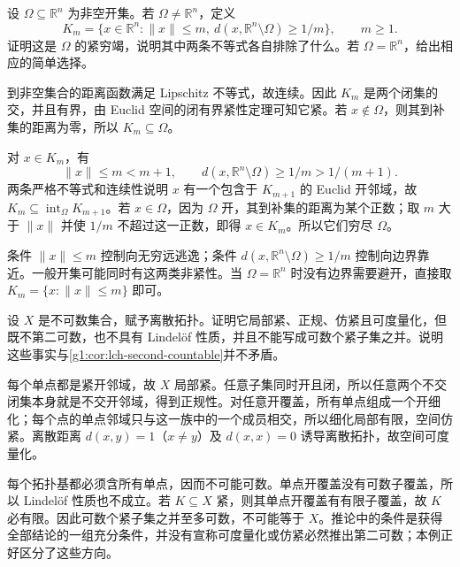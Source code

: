 \begin{exercise}\label{g1:ex:open-euclidean-exhaustion}
	设 \(\Omega\subseteq\mathbb R^n\) 为非空开集。若 \(\Omega\ne\mathbb R^n\)，定义
	\[
		K_m=\{x\in\mathbb R^n:\lVert x\rVert\le m,\ d(x,\mathbb R^n\setminus\Omega)\ge1/m\},
		\qquad m\ge1.
	\]
	证明这是 \(\Omega\) 的紧穷竭，说明其中两条不等式各自排除了什么。若 \(\Omega=\mathbb R^n\)，给出相应的简单选择。
\end{exercise}
\begin{solution}
	到非空集合的距离函数满足 Lipschitz 不等式，故连续。因此 \(K_m\) 是两个闭集的交，并且有界，由 Euclid 空间的闭有界紧性定理可知它紧。若 \(x\notin\Omega\)，则其到补集的距离为零，所以 \(K_m\subseteq\Omega\)。

	对 \(x\in K_m\)，有
	\[
		\lVert x\rVert\le m<m+1,\qquad
		d(x,\mathbb R^n\setminus\Omega)\ge1/m>1/(m+1).
	\]
	两条严格不等式和连续性说明 \(x\) 有一个包含于 \(K_{m+1}\) 的 Euclid 开邻域，故 \(K_m\subseteq\operatorname{int}_\Omega K_{m+1}\)。若 \(x\in\Omega\)，因为 \(\Omega\) 开，其到补集的距离为某个正数；取 \(m\) 大于 \(\lVert x\rVert\) 并使 \(1/m\) 不超过这一正数，即得 \(x\in K_m\)。所以它们穷尽 \(\Omega\)。

	条件 \(\lVert x\rVert\le m\) 控制向无穷远逃逸；条件 \(d(x,\mathbb R^n\setminus\Omega)\ge1/m\) 控制向边界靠近。一般开集可能同时有这两类非紧性。当 \(\Omega=\mathbb R^n\) 时没有边界需要避开，直接取 \(K_m=\{x:\lVert x\rVert\le m\}\) 即可。
\end{solution}

\begin{exercise}\label{g1:ex:uncountable-discrete}
	设 \(X\) 是不可数集合，赋予离散拓扑。证明它局部紧、正规、仿紧且可度量化，但既不第二可数，也不具有 Lindelöf 性质，并且不能写成可数个紧子集之并。说明这些事实与\cref{g1:cor:lch-second-countable}并不矛盾。
\end{exercise}
\begin{solution}
	每个单点都是紧开邻域，故 \(X\) 局部紧。任意子集同时开且闭，所以任意两个不交闭集本身就是不交开邻域，得到正规性。对任意开覆盖，所有单点组成一个开细化；每个点的单点邻域只与这一族中的一个成员相交，所以细化局部有限，空间仿紧。离散距离 \(d(x,y)=1\)（\(x\ne y\)）及 \(d(x,x)=0\) 诱导离散拓扑，故空间可度量化。

	每个拓扑基都必须含所有单点，因而不可能可数。单点开覆盖没有可数子覆盖，所以 Lindelöf 性质也不成立。若 \(K\subseteq X\) 紧，则其单点开覆盖有有限子覆盖，故 \(K\) 必有限。因此可数个紧子集之并至多可数，不可能等于 \(X\)。推论中的条件是获得全部结论的一组充分条件，并没有宣称可度量化或仿紧必然推出第二可数；本例正好区分了这些方向。
\end{solution}

